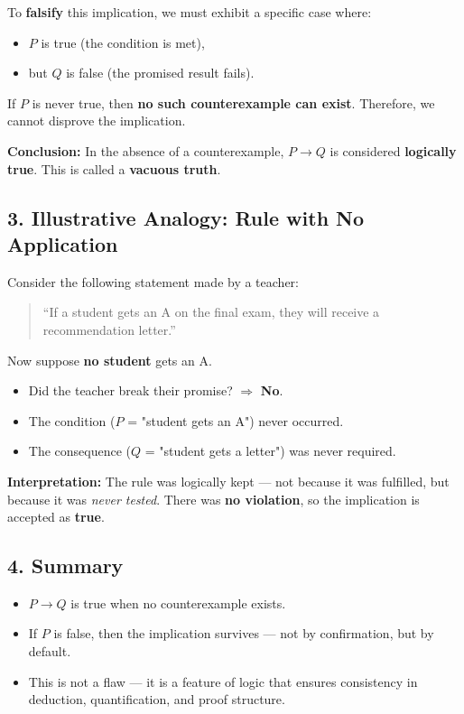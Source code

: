 \documentclass[10pt]{article}
\theoremstyle{plain}
\theoremstyle{definition}
\begin{document}
  To \textbf{falsify} this implication, we must exhibit a specific case where:
  \begin{itemize}
  	\item $P$ is true (the condition is met),
  	\item but $Q$ is false (the promised result fails).
  \end{itemize}
  
  If $P$ is never true, then \textbf{no such counterexample can exist}. Therefore, we cannot disprove the implication.
  
  \textbf{Conclusion:}  
  In the absence of a counterexample, $P \rightarrow Q$ is considered \textbf{logically true}. This is called a \textbf{vacuous truth}.
  
  \subsection*{3. Illustrative Analogy: Rule with No Application}
  
  Consider the following statement made by a teacher:
  \begin{quote}
  	“If a student gets an A on the final exam, they will receive a recommendation letter.”
  \end{quote}
  
  Now suppose \textbf{no student} gets an A.
  
  \begin{itemize}
  	\item Did the teacher break their promise? $\Rightarrow$ \textbf{No}.
  	\item The condition ($P$ = "student gets an A") never occurred.
  	\item The consequence ($Q$ = "student gets a letter") was never required.
  \end{itemize}
  
  \textbf{Interpretation:}  
  The rule was logically kept — not because it was fulfilled, but because it was \textit{never tested}. There was \textbf{no violation}, so the implication is accepted as \textbf{true}.
  
  \subsection*{4. Summary}
  
  \begin{itemize}
  	\item $P \rightarrow Q$ is true when no counterexample exists.
  	\item If $P$ is false, then the implication survives — not by confirmation, but by default.
  	\item This is not a flaw — it is a feature of logic that ensures consistency in deduction, quantification, and proof structure.
  \end{itemize}
  
  
\end{document}
